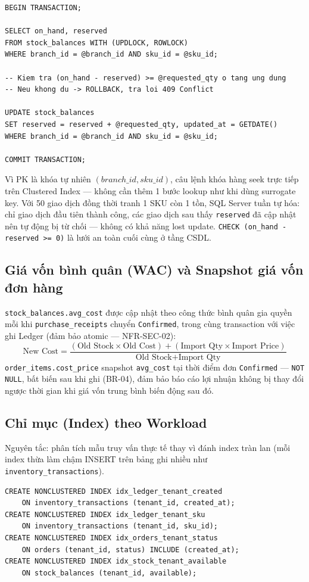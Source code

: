 \begin{lstlisting}
BEGIN TRANSACTION;

SELECT on_hand, reserved
FROM stock_balances WITH (UPDLOCK, ROWLOCK)
WHERE branch_id = @branch_id AND sku_id = @sku_id;

-- Kiem tra (on_hand - reserved) >= @requested_qty o tang ung dung
-- Neu khong du -> ROLLBACK, tra loi 409 Conflict

UPDATE stock_balances
SET reserved = reserved + @requested_qty, updated_at = GETDATE()
WHERE branch_id = @branch_id AND sku_id = @sku_id;

COMMIT TRANSACTION;
\end{lstlisting}
Vì PK là khóa tự nhiên \((branch\_id, sku\_id)\), câu lệnh khóa hàng seek trực tiếp trên Clustered Index — không cần thêm 1 bước lookup như khi dùng surrogate key. Với 50 giao dịch đồng thời tranh 1 SKU còn 1 tồn, SQL Server tuần tự hóa: chỉ giao dịch đầu tiên thành công, các giao dịch sau thấy \texttt{reserved} đã cập nhật nên tự động bị từ chối — không có khả năng lost update. \texttt{CHECK (on\_hand - reserved >= 0)} là lưới an toàn cuối cùng ở tầng CSDL.

\subsection{Giá vốn bình quân (WAC) và Snapshot giá vốn đơn hàng}
\texttt{stock\_balances.avg\_cost} được cập nhật theo công thức bình quân gia quyền mỗi khi \texttt{purchase\_receipts} chuyển \texttt{Confirmed}, trong cùng transaction với việc ghi Ledger (đảm bảo atomic — NFR-SEC-02):
\[
\text{New Cost} = \frac{(\text{Old Stock} \times \text{Old Cost}) + (\text{Import Qty} \times \text{Import Price})}{\text{Old Stock} + \text{Import Qty}}
\]
\texttt{order\_items.cost\_price} snapshot \texttt{avg\_cost} tại thời điểm đơn \texttt{Confirmed} — \texttt{NOT NULL}, bất biến sau khi ghi (BR-04), đảm bảo báo cáo lợi nhuận không bị thay đổi ngược thời gian khi giá vốn trung bình biến động sau đó.

\subsection{Chỉ mục (Index) theo Workload}
Nguyên tắc: phân tích mẫu truy vấn thực tế thay vì đánh index tràn lan (mỗi index thừa làm chậm INSERT trên bảng ghi nhiều như \texttt{inventory\_transactions}).

\begin{lstlisting}
CREATE NONCLUSTERED INDEX idx_ledger_tenant_created
    ON inventory_transactions (tenant_id, created_at);
CREATE NONCLUSTERED INDEX idx_ledger_tenant_sku
    ON inventory_transactions (tenant_id, sku_id);
CREATE NONCLUSTERED INDEX idx_orders_tenant_status
    ON orders (tenant_id, status) INCLUDE (created_at);
CREATE NONCLUSTERED INDEX idx_stock_tenant_available
    ON stock_balances (tenant_id, available);
\end{lstlisting}

